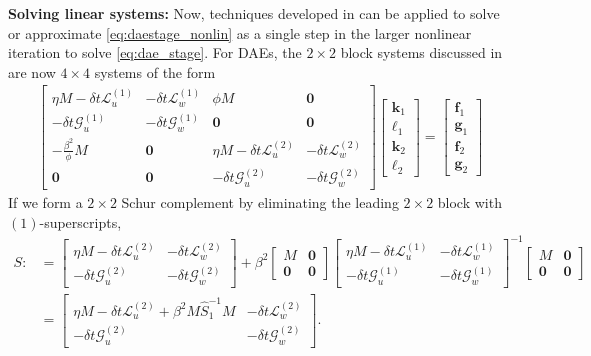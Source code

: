 \documentclass[review]{siamart}
\begin{document}
\textbf{Solving linear systems:}
Now, techniques developed in  can be applied to solve
or approximate \eqref{eq:daestage_nonlin} as a single step in the larger
nonlinear iteration to solve \eqref{eq:dae_stage}. For DAEs, the $2\times 2$
block systems discussed in  are now $4\times 4$ systems of
the form
%
\begin{align}\label{eq:dae_block}
\begin{bmatrix} \eta M - \delta t\mathcal{L}_{u}^{(1)} & -\delta t\mathcal{L}_{w}^{(1)}
		& \phi M & \mathbf{0} \\
	-\delta t\mathcal{G}_{u}^{(1)} & -\delta t\mathcal{G}_w^{(1)}
		& \mathbf{0} & \mathbf{0} \\
	-\tfrac{\beta^2}{\phi}M & \mathbf{0} & \eta M - \delta t\mathcal{L}_{u}^{(2)} &
		-\delta t\mathcal{L}_{w}^{(2)} \\
	\mathbf{0} & \mathbf{0} & -\delta t\mathcal{G}_{u}^{(2)} &
		-\delta t\mathcal{G}_w^{(2)} \end{bmatrix}
	\begin{bmatrix} \mathbf{k}_1 \\ \boldsymbol{\ell}_1 \\
		 \mathbf{k}_2 \\ \boldsymbol{\ell}_2 \end{bmatrix}
	= 	\begin{bmatrix} \mathbf{f}_1 \\ \mathbf{g}_1 \\
		 \mathbf{f}_2 \\ \mathbf{g}_2 \end{bmatrix}
\end{align}
%
If we form a $2\times 2$ Schur complement by eliminating the leading
$2\times 2$ block with $(1)$-superscripts,
%
\begin{align*}
S :& = \begin{bmatrix} \eta M - \delta t\mathcal{L}_{u}^{(2)} &
	-\delta t\mathcal{L}_{w}^{(2)} \\ -\delta t\mathcal{G}_{u}^{(2)} &
		-\delta t\mathcal{G}_w^{(2)} \end{bmatrix}
	+ \beta^2 \begin{bmatrix} M & \mathbf{0} \\\mathbf{0} & \mathbf{0} \end{bmatrix}
	\begin{bmatrix} \eta M - \delta t\mathcal{L}_{u}^{(1)} &
	-\delta t\mathcal{L}_{w}^{(1)} \\ -\delta t\mathcal{G}_{u}^{(1)} &
		-\delta t\mathcal{G}_w^{(1)} \end{bmatrix}^{-1}
	\begin{bmatrix} M & \mathbf{0} \\\mathbf{0} & \mathbf{0} \end{bmatrix} \\
& = \begin{bmatrix} \eta M - \delta t\mathcal{L}_{u}^{(2)} + \beta^2M \widehat{S}_1^{-1}M &
	-\delta t\mathcal{L}_{w}^{(2)} \\ -\delta t\mathcal{G}_{u}^{(2)} &
		-\delta t\mathcal{G}_w^{(2)} \end{bmatrix}.
\end{align*}
%
\end{document}
